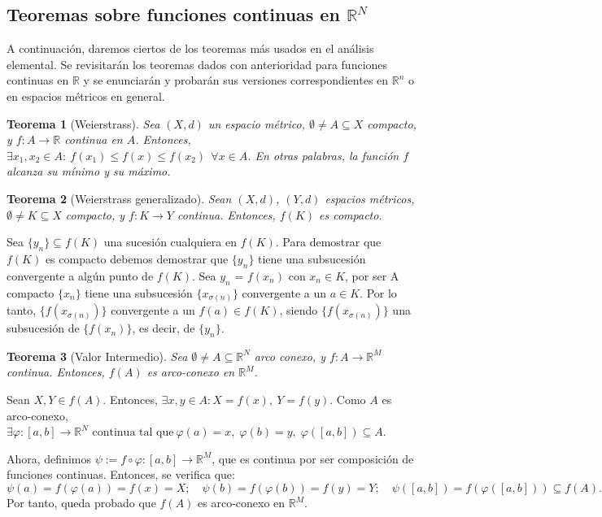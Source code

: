 \documentclass[11pt, a4paper, titlepage]{article}
\makeatletter
\renewenvironment{proof}[1][\proofname] {\vspace{-15pt}\par\pushQED{\qed}\normalfont\topsep6\p@\@plus6\p@\relax\trivlist\item[\hskip\labelsep\it#1\@addpunct{.}]\ignorespaces}{\popQED\endtrivlist\@endpefalse}
\newcommand{\R}{\mathbb{R}}
\theoremstyle{theorem-style}
\newtheorem*{nth}{Teorema}
\theoremstyle{definition-style}
\theoremstyle{remark-style}
\theoremstyle{example-style}
\makeatother
\begin{document}
\subsection{Teoremas sobre funciones continuas en $\mathbb{R}^N$}

A continuación, daremos ciertos de los teoremas más usados en el análisis elemental. Se revisitarán los teoremas dados con anterioridad para funciones continuas en $\R$ y se enunciarán y probarán sus versiones correspondientes en $\R^n$ o en espacios métricos en general.



\begin{nth}[Weierstrass]
Sea $(X,d)$ un espacio métrico, $\emptyset \ne A \subseteq X$ compacto, y $f:A \longrightarrow \mathbb{R}$ continua en $A$. Entonces, $\exists x_1,x_2 \in A: \ f(x_1)\le f(x) \le f(x_2)\ \ \forall x\in A$. En otras palabras, la función $f$ alcanza su mínimo y su máximo.
\end{nth}

\begin{nth}[Weierstrass generalizado]
Sean $(X,d)$, $(Y,d)$ espacios métricos, $\emptyset \ne K \subseteq X$ compacto, y $f: K \longrightarrow Y$ continua. Entonces, $f(K)$ es compacto.
\end{nth}
\begin{proof}
		Sea $\{y_n\}\subseteq f(K)$ una sucesión cualquiera en $f(K)$. Para demostrar que $f(K)$ es compacto debemos demostrar que $\{y_n\}$ tiene una subsucesión convergente a algún punto de $f(K)$. Sea $y_n$ = $f(x_n)$ con $x_n \in K$, por ser A compacto $\{x_n\}$ tiene una subsucesión $\{x_{\sigma(n)}\}$ convergente a un $a \in K$. Por lo tanto, $\{f(x_{\sigma(n)})\}$ convergente a un $f(a) \in f(K)$, siendo $\{f(x_{\sigma(n)})\}$ una subsucesión de $\{f(x_{n})\}$, es decir, de $\{y_n\}$.
\end{proof}



\begin{nth}[Valor Intermedio]
Sea $\emptyset \ne A \subseteq \mathbb{R}^N$ arco conexo, y $f: A \longrightarrow \mathbb{R}^M$ continua. Entonces, $f(A)$ es arco-conexo en $\mathbb{R}^M$.
\end{nth}

\begin{proof}
Sean $X,Y\in f(A)$. Entonces, $\exists x,y \in A : X=f(x), \ Y=f(y)$. Como $A$ es arco-conexo, $\exists\varphi : [a,b]\longrightarrow \mathbb{R}^N \text{ continua tal que}\ \varphi(a) = x,\; \varphi(b)=y,\; \varphi([a,b]) \subseteq A$.


Ahora, definimos $\psi := f\circ \varphi : [a,b] \longrightarrow \mathbb{R}^M$, que es continua por ser composición de funciones continuas. Entonces, se verifica que: $$\psi(a) = f(\varphi(a)) = f(x) = X;\quad \psi(b)= f(\varphi(b)) = f(y) = Y;\quad \psi([a,b]) = f(\varphi([a,b])) \subseteq f(A).$$
Por tanto, queda probado que $f(A)$ es arco-conexo en $\mathbb{R}^M$.
\end{proof}
\end{document}
